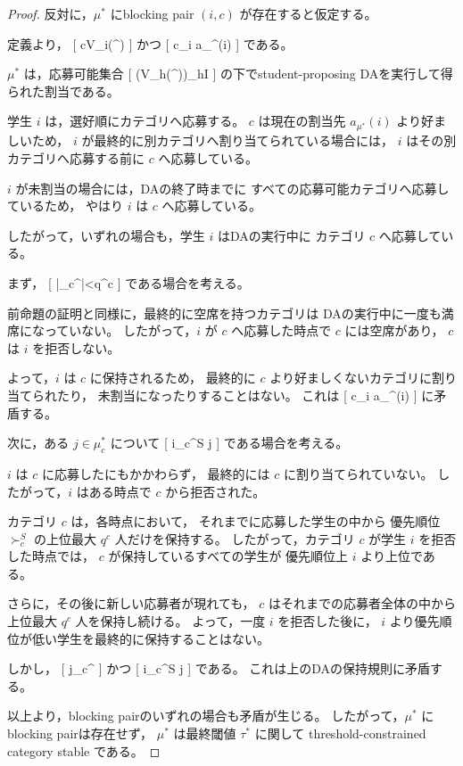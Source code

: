 \documentclass[
  12pt,
  a4paper,
  oneside,
  onecolumn,
  titlepage,
  final
]{jsarticle}
\newcommand{\1}{\mathbf{1}}
\begin{document}
\begin{proof}
反対に，$\mu^\ast$ にblocking pair $(i,c)$ が存在すると仮定する。

定義より，
[
c\in V_i(\tau^\ast)
]
かつ
[
c\succ_i a_{\mu^\ast}(i)
]
である。

$\mu^\ast$ は，応募可能集合
[
(V_h(\tau^\ast))_{h\in I}
]
の下でstudent-proposing DAを実行して得られた割当である。

学生 $i$ は，選好順にカテゴリへ応募する。
$c$ は現在の割当先 $a_{\mu^\ast}(i)$ より好ましいため，
$i$ が最終的に別カテゴリへ割り当てられている場合には，
$i$ はその別カテゴリへ応募する前に $c$ へ応募している。

$i$ が未割当の場合には，DAの終了時までに
すべての応募可能カテゴリへ応募しているため，
やはり $i$ は $c$ へ応募している。

したがって，いずれの場合も，学生 $i$ はDAの実行中に
カテゴリ $c$ へ応募している。

まず，
[
|\mu_c^\ast|<q^c
]
である場合を考える。

前命題の証明と同様に，最終的に空席を持つカテゴリは
DAの実行中に一度も満席になっていない。
したがって，$i$ が $c$ へ応募した時点で $c$ には空席があり，
$c$ は $i$ を拒否しない。

よって，$i$ は $c$ に保持されるため，
最終的に $c$ より好ましくないカテゴリに割り当てられたり，
未割当になったりすることはない。
これは
[
c\succ_i a_{\mu^\ast}(i)
]
に矛盾する。

次に，ある $j\in\mu_c^\ast$ について
[
i\succ_c^S j
]
である場合を考える。

$i$ は $c$ に応募したにもかかわらず，
最終的には $c$ に割り当てられていない。
したがって，$i$ はある時点で $c$ から拒否された。

カテゴリ $c$ は，各時点において，
それまでに応募した学生の中から
優先順位 $\succ_c^S$ の上位最大 $q^c$ 人だけを保持する。
したがって，カテゴリ $c$ が学生 $i$ を拒否した時点では，
$c$ が保持しているすべての学生が
優先順位上 $i$ より上位である。

さらに，その後に新しい応募者が現れても，
$c$ はそれまでの応募者全体の中から
上位最大 $q^c$ 人を保持し続ける。
よって，一度 $i$ を拒否した後に，
$i$ より優先順位が低い学生を最終的に保持することはない。

しかし，
[
j\in\mu_c^\ast
]
かつ
[
i\succ_c^S j
]
である。
これは上のDAの保持規則に矛盾する。

以上より，blocking pairのいずれの場合も矛盾が生じる。
したがって，$\mu^\ast$ にblocking pairは存在せず，
$\mu^\ast$ は最終閾値 $\tau^\ast$ に関して
threshold-constrained category stable である。
\end{proof}
\end{document}
